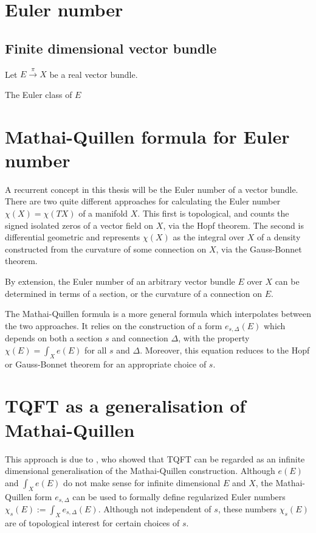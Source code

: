 \section{Euler number}
\subsection{Finite dimensional vector bundle}
Let $E \xrightarrow{\pi} X$ be a real vector bundle.  

The Euler class of  $E$

\section{Mathai-Quillen formula for Euler number}
A recurrent concept in this thesis will be the Euler number of a vector bundle.
There are two quite different approaches for calculating the Euler number
$\chi(X) = \chi(TX)$ of a manifold  $X$. This first is topological, and counts
the signed isolated zeros of a vector field on $X$, via the Hopf theorem. The
second is differential geometric and represents  $\chi(X)$ as the integral over
$X$ of a density constructed from the curvature of some connection on  $X$, via
the Gauss-Bonnet theorem. 

By extension, the Euler number of an arbitrary vector bundle $E$ over $X$ can be
determined in terms of a section, or the curvature of a connection on  $E$.

The Mathai-Quillen formula \cite{MQformula} is a more general formula which interpolates between
the two approaches. It relies on the construction of a form $e_{s,\Delta}(E)$ which depends
on both a section  $s$ and connection  $\Delta$, with the property
$\chi(E)=\int_X e(E)$ for all $s$ and  $\Delta$. Moreover, this equation reduces
to the Hopf or Gauss-Bonnet theorem for an appropriate choice of $s$. 

\section{TQFT as a generalisation of Mathai-Quillen}
 This approach is
due to \cite{atiyahlagrangians}, who showed that TQFT can be regarded as an
infinite dimensional generalisation of the Mathai-Quillen construction. 
Although $e(E)$ and  $\int_X e(E)$ do not make sense for
infinite dimensional  $E$ and  $X$, the Mathai-Quillen form  $e_{s,\Delta}$ can
be used to formally define regularized Euler numbers $\chi_s(E) := \int_X
e_{s,\Delta}(E)$. Although not independent of $s$, these numbers  $\chi_s(E)$
are of topological interest for certain choices of  $s$.  



